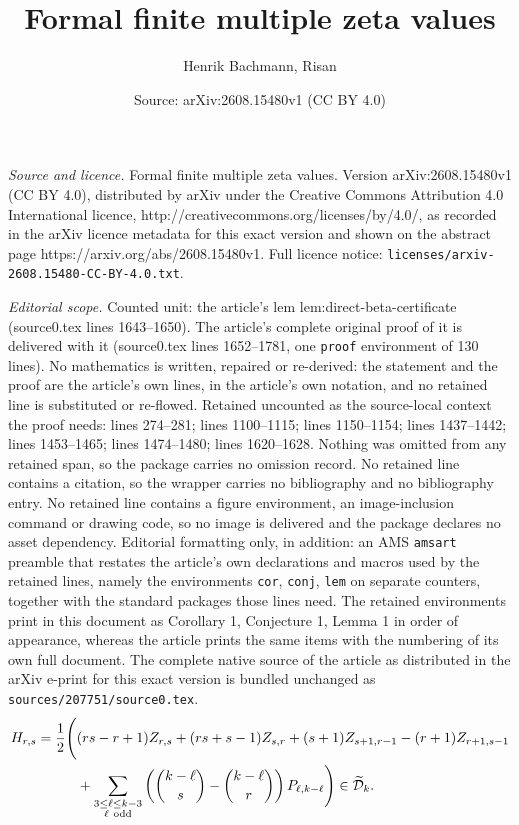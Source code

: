 \documentclass[10pt,a4paper]{amsart}
\title{Formal finite multiple zeta values}
\author{Henrik Bachmann, Risan}
\date{Source: arXiv:2608.15480v1 (CC BY 4.0)}
\newcommand{\Dtk}{\widetilde{\mathcal D}_k}
\begin{document}
\maketitle

\noindent\emph{Source and licence.} Formal finite multiple zeta values. Version arXiv:2608.15480v1 (CC BY 4.0), distributed by arXiv under the Creative Commons Attribution 4.0 International licence, http://creativecommons.org/licenses/by/4.0/, as recorded in the arXiv licence metadata for this exact version and shown on the abstract page https://arxiv.org/abs/2608.15480v1. Full licence notice: \texttt{licenses/arxiv-2608.15480-CC-BY-4.0.txt}.\par\smallskip

\noindent\textit{Editorial scope.} Counted unit: the article's lem lem:direct-beta-certificate (source0.tex lines 1643--1650). The article's complete original proof of it is delivered with it (source0.tex lines 1652--1781, one \texttt{proof} environment of 130 lines). No mathematics is written, repaired or re-derived: the statement and the proof are the article's own lines, in the article's own notation, and no retained line is substituted or re-flowed.  Retained uncounted as the source-local context the proof needs: lines 274--281; lines 1100--1115; lines 1150--1154; lines 1437--1442; lines 1453--1465; lines 1474--1480; lines 1620--1628.  Nothing was omitted from any retained span, so the package carries no omission record.  No retained line contains a citation, so the wrapper carries no bibliography and no bibliography entry.  No retained line contains a figure environment, an image-inclusion command or drawing code, so no image is delivered and the package declares no asset dependency.  Editorial formatting only, in addition: an AMS \texttt{amsart} preamble that restates the article's own declarations and macros used by the retained lines, namely the environments \texttt{cor}, \texttt{conj}, \texttt{lem} on separate counters, together with the standard packages those lines need.  The retained environments print in this document as Corollary 1, Conjecture 1, Lemma 1 in order of appearance, whereas the article prints the same items with the numbering of its own full document.  The complete native source of the article as distributed in the arXiv e-print for this exact version is bundled unchanged as \texttt{sources/207751/source0.tex}.
\begin{align}\label{eq:H-source-element}
 H_{r,s}=\frac12\Bigg(&
 (rs-r+1)Z_{r,s}+(rs+s-1)Z_{s,r}
 +(s+1)Z_{s+1,r-1}-(r+1)Z_{r+1,s-1}\notag\\
 &+\sum_{\substack{3\leq\ell\leq k-3\\\ell\ \mathrm{odd}}}
 \left(\binom{k-\ell}{s}-\binom{k-\ell}{r}\right)
 P_{\ell,k-\ell}\Bigg)\in\Dtk.
\end{align}
\end{document}
